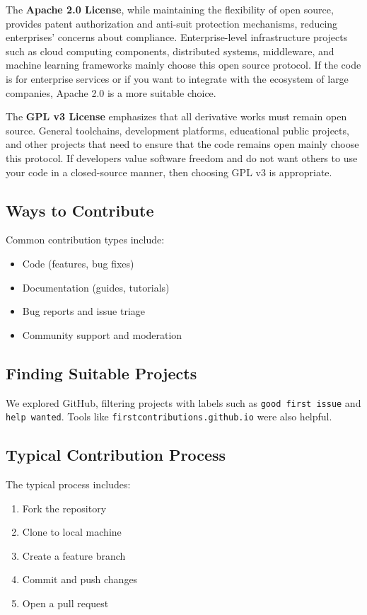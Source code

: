 \documentclass[12pt]{article}
\begin{document}
The \textbf{Apache 2.0 License}, while maintaining the flexibility of open source, provides patent authorization and anti-suit protection mechanisms, reducing enterprises' concerns about compliance. Enterprise-level infrastructure projects such as cloud computing components, distributed systems, middleware, and machine learning frameworks mainly choose this open source protocol. If the code is for enterprise services or if you want to integrate with the ecosystem of large companies, Apache 2.0 is a more suitable choice. 

The \textbf{GPL v3 License} emphasizes that all derivative works must remain open source. General toolchains, development platforms, educational public projects, and other projects that need to ensure that the code remains open mainly choose this protocol. If developers value software freedom and do not want others to use your code in a closed-source manner, then choosing GPL v3 is appropriate.


\subsection{Ways to Contribute}
Common contribution types include:
\begin{itemize}
    \item Code (features, bug fixes)
    \item Documentation (guides, tutorials)
    \item Bug reports and issue triage
    \item Community support and moderation
\end{itemize}

\subsection{Finding Suitable Projects}
We explored GitHub, filtering projects with labels such as \texttt{good first issue} and \texttt{help wanted}. Tools like \texttt{firstcontributions.github.io} were also helpful.

\subsection{Typical Contribution Process}
The typical process includes:
\begin{enumerate}
    \item Fork the repository
    \item Clone to local machine
    \item Create a feature branch
    \item Commit and push changes
    \item Open a pull request
\end{enumerate}
\end{document}
